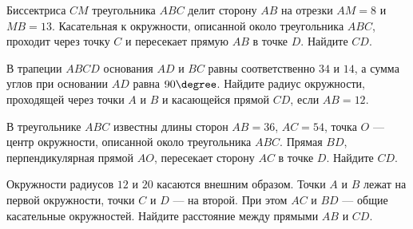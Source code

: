 \begin{consultation}
	\begin{listofex}
		\item Биссектриса \( CM \) треугольника \( ABC \) делит сторону \( AB \) на отрезки \( AM=8 \) и \( MB=13 \). Касательная к окружности, описанной около треугольника \( ABC \), проходит через точку \( C \) и пересекает прямую \( AB \) в точке \( D \). Найдите \( CD \).
		\item В трапеции \( ABCD \) основания \( AD \) и \( BC \) равны соответственно \( 34 \) и \( 14 \), а сумма углов при основании \( AD \) равна \( 90\degree \). Найдите радиус окружности, проходящей через точки \( A \) и \( B \) и касающейся прямой \( CD \), если \( AB=12 \).
		\item В треугольнике \( ABC \) известны длины сторон \( AB=36 \), \( AC=54 \), точка \( O \) --- центр окружности, описанной около треугольника \( ABC \). Прямая \( BD \), перпендикулярная прямой \( AO \), пересекает сторону \( AC \) в точке \( D \). Найдите \( CD \).
		\item Окружности радиусов \( 12 \) и \( 20 \) касаются внешним образом. Точки \( A \) и \( B \) лежат на первой окружности, точки \( C \) и \( D \) --- на второй. При этом \( AC \) и \( BD \) --- общие касательные окружностей. Найдите расстояние между прямыми \( AB \) и \( CD \).
	\end{listofex}
\end{consultation}
